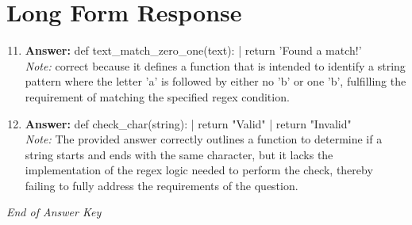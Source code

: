 \documentclass[12pt]{article}
\begin{document}
\section*{Long Form Response}
\begin{enumerate}[label=\arabic*.]
\setcounter{enumi}{10}
\item \textbf{Answer:} def text\_match\_zero\_one(text): | return 'Found a match!'
\\ \textit{Note:} correct because it defines a function that is intended to identify a string pattern where the letter 'a' is followed by either no 'b' or one 'b', fulfilling the requirement of matching the specified regex condition.
\item \textbf{Answer:} def check\_char(string): | return "Valid" | return "Invalid"
\\ \textit{Note:} The provided answer correctly outlines a function to determine if a string starts and ends with the same character, but it lacks the implementation of the regex logic needed to perform the check, thereby failing to fully address the requirements of the question.
\end{enumerate}

\vfill
\noindent\textit{End of Answer Key}
\end{document}
